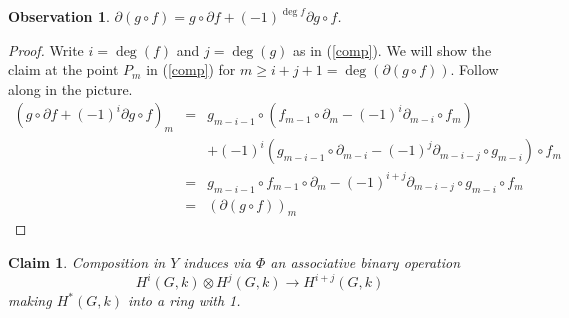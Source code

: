 \documentclass[12pt]{article}
\newtheorem{claim}[definition]{Claim}
\newtheorem{observation}[definition]{Observation}
\begin{document}
\begin{observation}\label{differential}
$\displaystyle{\partial\left(g\circ f\right)
=g\circ\partial f
+\left(-1\right)^{\deg f}\partial g\circ f}$.
\end{observation}
\begin{proof} Write $i=\deg\left(f\right)$
and $j=\deg\left(g\right)$ as in (\ref{comp}). 
We will show the claim at the point $P_m$ in (\ref{comp})
for $m\ge i+j+1=\deg\left(\partial\left(g\circ f\right)\right)$.
Follow along in the picture.
\begin{eqnarray*}
\left(g\circ\partial f+\left(-1\right)^i 
\partial g\circ f\right)_m
&=&
g_{m-i-1}\circ
\left(f_{m-1}\circ\partial_m
-\left(-1\right)^i\partial_{m-i}\circ f_m
\right)\\
&&+\left(-1\right)^i\left(
g_{m-i-1}\circ\partial_{m-i}
-\left(-1\right)^j
\partial_{m-i-j}\circ g_{m-i}\right)
\circ f_m\\
&=&g_{m-i-1}\circ f_{m-1}\circ\partial_m
-\left(-1\right)^{i+j}
\partial_{m-i-j}\circ g_{m-i}\circ f_m\\
&=&\left(\partial\left(g\circ f\right)
\right)_m
\end{eqnarray*}
\end{proof}
\begin{claim}
Composition in $Y$ induces via $\Phi$ an associative binary operation 
\[H^i\left(G,k\right)
\otimes H^j\left(G,k\right)
\to H^{i+j}\left(G,k\right)\]
making $H^\ast\left(G,k\right)$ into a ring with 1.
\end{claim}
\end{document}
